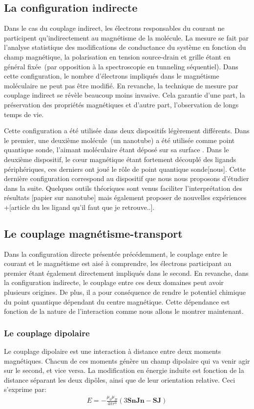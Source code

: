 \subsection{La configuration indirecte}

Dans le cas du couplage indirect, les électrons responsables du courant ne participent qu'indirectement au magnétisme de la molécule. La mesure se fait par l'analyse statistique des modifications de conductance du système en fonction du champ magnétique, la polarisation en tension source-drain et grille étant en général fixée~(par opposition à la spectroscopie en tunneling séquentiel). Dans cette configuration, le nombre d'électrons impliqués dans le magnétisme moléculaire ne peut pas être modifié. En revanche, la technique de mesure par couplage indirect se révèle beaucoup moins invasive. Cela garantie d'une part, la préservation des propriétés magnétiques et d'autre part, l'observation de longs temps de vie. 

Cette configuration a été utilisée dans deux dispositifs légèrement différents. Dans le premier, une deuxième molécule~(un nanotube) a été utilisée comme point quantique sonde, l'aimant moléculaire étant déposé sur sa surface \cite{Urdampilleta2011}. Dans le deuxième dispositif, le cœur magnétique étant fortement découplé des ligands périphériques, ces derniers ont joué le rôle de point quantique sonde[nous]. Cette dernière configuration correspond au dispositif que nous nous proposons d'étudier dans la suite. Quelques outils théoriques sont venus faciliter l'interprétation des résultats [papier sur nanotube] mais également proposer de nouvelles expériences~\cite{Jaafar2010} +[article du les ligand qu'il faut que je retrouve..].


\subsection{Le couplage magnétisme-transport}
Dans la configuration directe présentée précédemment, le couplage entre le courant et le magnétisme est aisé à comprendre, les électrons participant au premier étant également directement impliqués dans le second. En revanche, dans la configuration indirecte, le couplage entre ces deux domaines peut avoir plusieurs origines. De plus, il a pour conséquence de rendre le potentiel chimique du point quantique dépendant du centre magnétique. Cette dépendance est fonction de la nature de l'interaction comme nous allons le montrer maintenant.

\subsubsection{Le couplage dipolaire}
Le couplage dipolaire est une interaction à distance entre deux moments magnétiques. Chacun de ces moments génère un champ dipolaire qui va venir agir sur le second, et vice versa. La modification en énergie induite est fonction de la distance séparant les deux dipôles, ainsi que de leur orientation relative. Ceci s'exprime par:
\begin{eqnarray}
E = -\frac{\mu_0 \mu_B}{4\pi r^3}(3\mathbf{SnJn} - \mathbf{SJ}) \nonumber
\end{eqnarray}

